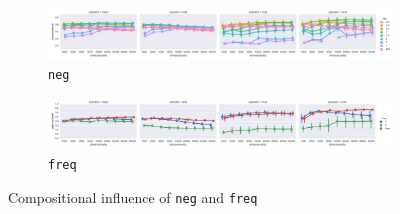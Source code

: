 \begin{figure}
  \centering

  \begin{subfigure}[t]{\textwidth}
    \includegraphics[width=1.1\textwidth]{supplement/figures/compositional-interaction-neg}

  \caption{\texttt{neg}}
  \label{fig:compositional-neg}
  \end{subfigure}

  \begin{subfigure}[t]{\textwidth}
    \includegraphics[width=1.1\textwidth]{supplement/figures/compositional-interaction-freq}

  \caption{\texttt{freq}}
  \label{fig:compositional-freq}
  \end{subfigure}

  \caption{Compositional influence of \texttt{neg} and \texttt{freq}}
\end{figure}

